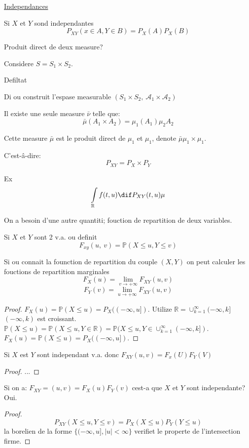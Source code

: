 \underline{Independances}

Si $X$ et $Y$ sond independantes
$$P_{XY}(x\in A, Y\in B)=P_X(A) P_X(B)$$

Produit direct de deux measure?

Considere $S=S_1\times S_2$.

Defiltat

Di ou construit l'espase measurable $(S_1\times S_2,\ \mathcal{A}_1\times\mathcal{A}_2)$

Il existe une seule measure $\bar{\nu}$ telle que:
$$\bar{\mu}(A_1\times A_2)=\mu_1(A_1)\mu_2{A_2}$$

Cette measure $\bar{\mu}$ est le produit direct de $\mu_1$ et $\mu_1$, denote $\bar{\mu}\mu_1\times\mu_1$.

C'est-â-dire:
$$P_{XY}=P_X\times P_Y$$ %

Ex
$$\int\limits_{\mathbb{R}} f(t,u) \dif P_{XY}(t, u)\mu$$

On a besoin d'une autre quantiti; fouction de repartition de deux variables.

\begin{definition}
	Si $X$ et $Y$ sont 2 v.a. ou definit
	$$F_{xy}(u,\ v)=\mathbb{P}(X\leq u, Y\leq v)$$
\end{definition}

\begin{proposition}
	Si ou connait la founction de repartition du couple $(X,Y)$ on peut calculer les fouctions de repartition marginales
	$$F_X(u)=\lim\limits_{v\rightarrow +\infty}F_{XY}(u, v)$$
	$$F_Y(v)=\lim\limits_{u\rightarrow +\infty}F_{XY}(u, v)$$
\end{proposition}
\begin{proof}
	$F_X(u)=\mathbb{P}(X\leq u)=P_X((-\infty, u])$. Utilize $\mathbb{R}=\cup^\infty_{k=1}(-\infty, k]$ $(-\infty, k)$ est croissant. $\mathbb{P}(X\leq u)=\mathbb{P}(X\leq u, Y\in\mathbb{R})=\mathbb{P}(X\leq u, Y\in\cup_{k=1}^\infty(-\infty, k])$. $F_X(u)=\mathbb{P}(X\leq u)=P_X((-\infty, u])$.
\end{proof}

\begin{proposition}
	Si $X$ est $Y$ sont independant v.a. donc $F_{XY}(u, v)=F_x(U) F_Y(V)$
\end{proposition}
\begin{proof}
	...
\end{proof}

\begin{proposition}	
	Si on a: $F_{XY}=(u, v)=F_X(u)F_Y(v)$ cest-a que $X$ et $Y$ sont independante? Oui.
\end{proposition}
\begin{proof}
	$$P_{XY}(X\leq u, Y\leq v)=P_X(X\leq u)P_Y(Y\leq u)$$
	la borelien de la forme $\{(-\infty, u], |u|<\infty\}$ verifiet le properte de l'intersection firme.
\end{proof}

